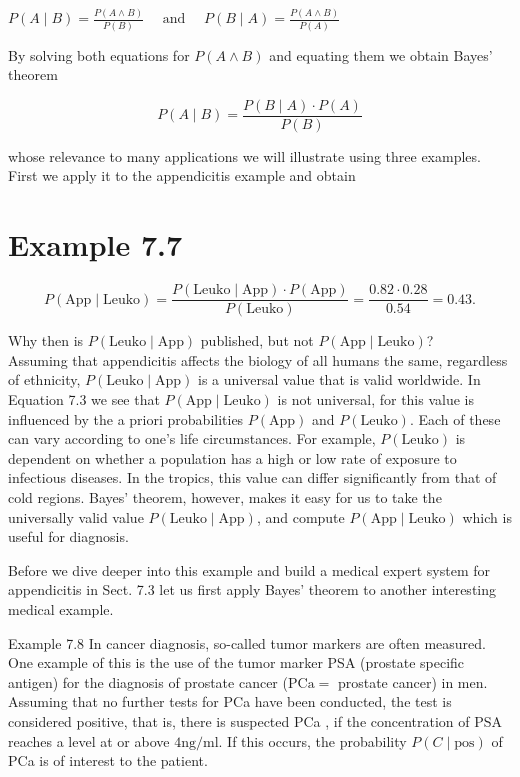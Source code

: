 \documentclass[10pt]{book}
\begin{document}
$
P(A \mid B)=\frac{P(A \wedge B)}{P(B)} \quad \text { and } \quad P(B \mid A)=\frac{P(A \wedge B)}{P(A)}
$

By solving both equations for $P(A \wedge B)$ and equating them we obtain Bayes’ theorem

\begin{equation*}
P(A \mid B)=\frac{P(B \mid A) \cdot P(A)}{P(B)} \tag{7.2}
\end{equation*}

whose relevance to many applications we will illustrate using three examples. First we apply it to the appendicitis example and obtain

\section{Example 7.7}

\begin{equation*}
P(\text{App} \mid \text{Leuko})=\frac{P(\text{Leuko} \mid \text{App}) \cdot P(\text{App})}{P(\text{Leuko})}=\frac{0.82 \cdot 0.28}{0.54}=0.43 . \tag{7.3}
\end{equation*}

Why then is $P(\text{Leuko}\mid \text{App})$ published, but not $P(\text{App}\mid \text{Leuko})$?\\
Assuming that appendicitis affects the biology of all humans the same, regardless of ethnicity, $P(\text{Leuko}\mid \text{App})$ is a universal value that is valid worldwide. In Equation 7.3 we see that $P(\text{App}\mid \text{Leuko})$ is not universal, for this value is influenced by the a priori probabilities $P(\text{App})$ and $P(\text{Leuko})$. Each of these can vary according to one's life circumstances. For example, $P(\text{Leuko})$ is dependent on whether a population has a high or low rate of exposure to infectious diseases. In the tropics, this value can differ significantly from that of cold regions. Bayes' theorem, however, makes it easy for us to take the universally valid value $P(\text{Leuko}\mid \text{App})$, and compute $P(\text{App}\mid \text{Leuko})$ which is useful for diagnosis.

Before we dive deeper into this example and build a medical expert system for appendicitis in Sect. 7.3 let us first apply Bayes' theorem to another interesting medical example.

Example 7.8 In cancer diagnosis, so-called tumor markers are often measured. One example of this is the use of the tumor marker PSA (prostate specific antigen) for the diagnosis of prostate cancer ($\mathrm{PCa}=$ prostate cancer) in men. Assuming that no further tests for PCa have been conducted, the test is considered positive, that is, there is suspected PCa , if the concentration of PSA reaches a level at or above $4 \mathrm{ng} / \mathrm{ml}$. If this occurs, the probability $P(C \mid \text{pos})$ of PCa is of interest to the patient.
\end{document}
